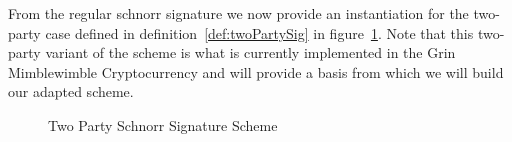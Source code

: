 From the regular schnorr signature we now provide an instantiation for the two-party case defined in definition~\ref{def:twoPartySig} in figure~\ref{fig:twoparty-schnorr}. Note that this two-party variant of the scheme is what is
currently implemented in the Grin Mimblewimble Cryptocurrency and will provide a basis from which we will build our adapted scheme.

\begin{figure}
    \begin{center}
        \fbox{
            \begin{varwidth}{\textwidth}
                \procedure[linenumbering, syntaxhighlight=auto]{$\procSetupPartSig{\varSecParam}$}{
                    \varNonce \sample \cnstIntegersPrimeWithoutZero{\varPrime} \\
                    \varRand \opAssign \funGen{\varRand} \\
                    \pcreturn (\varNonce \opSeperate \varRand)
                }
                \procedure[linenumbering, syntaxhighlight=auto]{$\procGenPartSig{\varMsg}{\varSecKeyAlice}{\varNonceAlice}{\varPubKeyBob}{\varRandBob}$} {
                    \varSchnorrChallenge \opAssign \funHash{\varMsg \opConc \varRandAlice \opAddPoint \varRandBob \opConc \varPubKeyAlice \opAddPoint \varPubKeyBob} \\
                    \varS \opAssign \varNonceAlice \opAddScalar \varSchnorrChallenge \opTimesScalar \varSecKeyAlice \\
                    \pcreturn \varSigAlice \opAssign \varS
                } \\
                \procedure[linenumbering, syntaxhighlight=auto]{$\procVerfPartSig{\varMsg}{\varSecKeyAlice}{\varNonceAlice}{\varPubKeyBob}{\varRandBob}{\varSigBob}$} {
                    \varSchnorrChallenge \opAssign \funHash{\varMsg \opConc \varRandAlice \opAddPoint \varRandBob \opConc \varPubKeyAlice \opAddPoint \varPubKeyBob} \\
                    \varS \opAssign \opAccess{\varSigBob}{\varS} \\
                    \pcreturn \funGen{\varS} \opEq \opPointScalar{\varRandBob}{\varSchnorrChallenge} \opAddPoint \varPubKeyBob
                } \\
                \procedure[linenumbering, syntaxhighlight=auto]{$\procFinSig{\varSigAlice}{\varSigBob}{\varRandAlice}{\varRandBob}$} {
                    \varS_\varAlice \opAssign \opAccess{\varSigAlice}{\varS} \\
                    \varS_\varBob \opAssign \opAccess{\varSigBob}{\varS} \\
                    \pcreturn \varSigFin \opAssign (\varS \opAssign \varS_\varAlice \opAddScalar \varS_\varBob \opSeperate \varRand \opAssign \varRandAlice \opAddPoint \varRandBob)
                }
            \end{varwidth}
        }
    \end{center}
    \caption{Two Party Schnorr Signature Scheme}
    \label{fig:twoparty-schnorr}
\end{figure}

